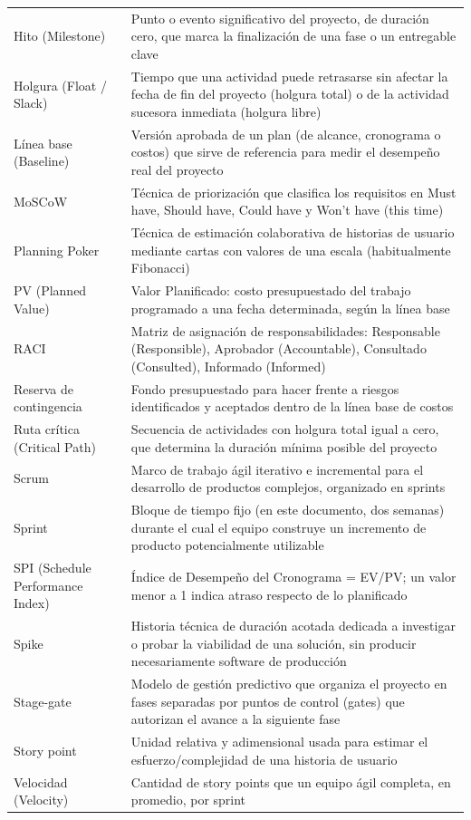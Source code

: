 \documentclass[11pt,a4paper]{article}
\begin{document}
{\begin{longtable}[]{@{}
  >{\raggedright\arraybackslash}p{}
  >{\raggedright\arraybackslash}p{}@{}}
Hito (Milestone) & Punto o evento significativo del proyecto, de duración cero, que marca la finalización de una fase o un entregable clave \\
Holgura (Float / Slack) & Tiempo que una actividad puede retrasarse sin afectar la fecha de fin del proyecto (holgura total) o de la actividad sucesora inmediata (holgura libre) \\
Línea base (Baseline) & Versión aprobada de un plan (de alcance, cronograma o costos) que sirve de referencia para medir el desempeño real del proyecto \\
MoSCoW & Técnica de priorización que clasifica los requisitos en Must have, Should have, Could have y Won't have (this time) \\
Planning Poker & Técnica de estimación colaborativa de historias de usuario mediante cartas con valores de una escala (habitualmente Fibonacci) \\
PV (Planned Value) & Valor Planificado: costo presupuestado del trabajo programado a una fecha determinada, según la línea base \\
RACI & Matriz de asignación de responsabilidades: Responsable (Responsible), Aprobador (Accountable), Consultado (Consulted), Informado (Informed) \\
Reserva de contingencia & Fondo presupuestado para hacer frente a riesgos identificados y aceptados dentro de la línea base de costos \\
Ruta crítica (Critical Path) & Secuencia de actividades con holgura total igual a cero, que determina la duración mínima posible del proyecto \\
Scrum & Marco de trabajo ágil iterativo e incremental para el desarrollo de productos complejos, organizado en sprints \\
Sprint & Bloque de tiempo fijo (en este documento, dos semanas) durante el cual el equipo construye un incremento de producto potencialmente utilizable \\
SPI (Schedule Performance Index) & Índice de Desempeño del Cronograma = EV/PV; un valor menor a 1 indica atraso respecto de lo planificado \\
Spike & Historia técnica de duración acotada dedicada a investigar o probar la viabilidad de una solución, sin producir necesariamente software de producción \\
Stage-gate & Modelo de gestión predictivo que organiza el proyecto en fases separadas por puntos de control (gates) que autorizan el avance a la siguiente fase \\
Story point & Unidad relativa y adimensional usada para estimar el esfuerzo/complejidad de una historia de usuario \\
Velocidad (Velocity) & Cantidad de story points que un equipo ágil completa, en promedio, por sprint \\
\end{longtable}
}
\end{document}
